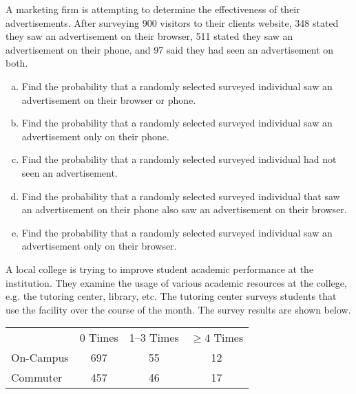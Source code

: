 \documentclass[11pt,letterpaper]{article}
\begin{document}

 A marketing firm is attempting to determine the effectiveness of their advertisements. After surveying 900 visitors to their clients website, 348 stated they saw an advertisement on their browser, 511 stated they saw an advertisement on their phone, and 97 said they had seen an advertisement on both. 
	\begin{enumerate}[(a)]
	\item Find the probability that a randomly selected surveyed individual saw an advertisement on their browser or phone.
	\item Find the probability that a randomly selected surveyed individual saw an advertisement only on their phone.
	\item Find the probability that a randomly selected surveyed individual had not seen an advertisement. 
	\item Find the probability that a randomly selected surveyed individual that saw an advertisement on their phone also saw an advertisement on their browser. 
	\item Find the probability that a randomly selected surveyed individual saw an advertisement only on their browser. 
	\end{enumerate}



\newpage



 A local college is trying to improve student academic performance at the institution. They examine the usage of various academic resources at the college, e.g. the tutoring center, library, etc. The tutoring center surveys students that use the facility over the course of the month. The survey results are shown below. \par
	\begin{table}[H]
	\centering
	\begin{tabular}{lccc}
							& 0 Times & 1--3 Times & $\geq 4$ Times \\ \cline{2-4}
	\multicolumn{1}{l|}{On-Campus} & \multicolumn{1}{c|}{697} & \multicolumn{1}{c|}{55} & \multicolumn{1}{c|}{12} \\ \cline{2-4}
	\multicolumn{1}{l|}{Commuter} & \multicolumn{1}{c|}{457} & \multicolumn{1}{c|}{46} & \multicolumn{1}{c|}{17} \\ \cline{2-4}
	\end{tabular}
	\end{table} \par
	
\end{document}
